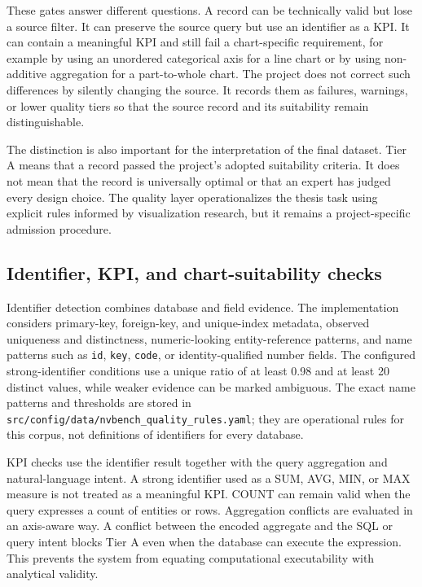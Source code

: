 These gates answer different questions. A record can be technically valid but lose a source filter. It can preserve the source query but use an identifier as a KPI. It can contain a meaningful KPI and still fail a chart-specific requirement, for example by using an unordered categorical axis for a line chart or by using non-additive aggregation for a part-to-whole chart. The project does not correct such differences by silently changing the source. It records them as failures, warnings, or lower quality tiers so that the source record and its suitability remain distinguishable.

The distinction is also important for the interpretation of the final dataset. Tier A means that a record passed the project's adopted suitability criteria. It does not mean that the record is universally optimal or that an expert has judged every design choice. The quality layer operationalizes the thesis task using explicit rules informed by visualization research, but it remains a project-specific admission procedure.

\subsection{Identifier, KPI, and chart-suitability checks}

Identifier detection combines database and field evidence. The implementation considers primary-key, foreign-key, and unique-index metadata, observed uniqueness and distinctness, numeric-looking entity-reference patterns, and name patterns such as \texttt{id}, \texttt{key}, \texttt{code}, or identity-qualified number fields. The configured strong-identifier conditions use a unique ratio of at least 0.98 and at least 20 distinct values, while weaker evidence can be marked ambiguous. The exact name patterns and thresholds are stored in \nolinkurl{src/config/data/nvbench_quality_rules.yaml}; they are operational rules for this corpus, not definitions of identifiers for every database.

KPI checks use the identifier result together with the query aggregation and natural-language intent. A strong identifier used as a SUM, AVG, MIN, or MAX measure is not treated as a meaningful KPI. COUNT can remain valid when the query expresses a count of entities or rows. Aggregation conflicts are evaluated in an axis-aware way. A conflict between the encoded aggregate and the SQL or query intent blocks Tier A even when the database can execute the expression. This prevents the system from equating computational executability with analytical validity.

